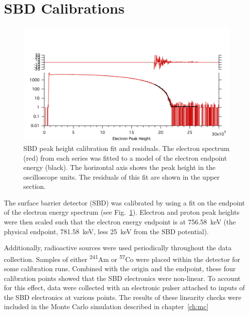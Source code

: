\documentclass[oneside,12pt]{memoir}
\begin{document}
\section{SBD Calibrations}
\label{sec:sbd_cal}
\begin{figure}[t]
	\includegraphics[width=\textwidth]{G_ePkHt_1.png}
	\caption[SBD peak height calibration fit.]{SBD peak height calibration fit and residuals. The electron spectrum (red) from each series was fitted to a model of the electron endpoint energy (black). The horizontal axis shows the peak height in the oscilloscope units. The residuals of this fit are shown in the upper section.}
	\label{fig:sbd_cal}
\end{figure}
The surface barrier detector (SBD) was calibrated by using a fit on the endpoint of the electron energy spectrum (see Fig.~\ref{fig:sbd_cal}). Electron and proton peak heights were then scaled such that the electron energy endpoint is at 756.58~keV (the physical endpoint, 781.58~keV, less 25~keV from the SBD potential).\par
Additionally, radioactive sources were used periodically throughout the data collection. Samples of either \textsuperscript{241}Am or \textsuperscript{57}Co were placed within the detector for some calibration runs. Combined with the origin and the endpoint, these four calibration points showed that the SBD electronics were non-linear. To account for this effect, data were collected with an electronic pulser attached to inputs of the SBD electronics at various points. The results of these linearity checks were included in the Monte Carlo simulation described in chapter~\ref{ch:mc}
\end{document}
